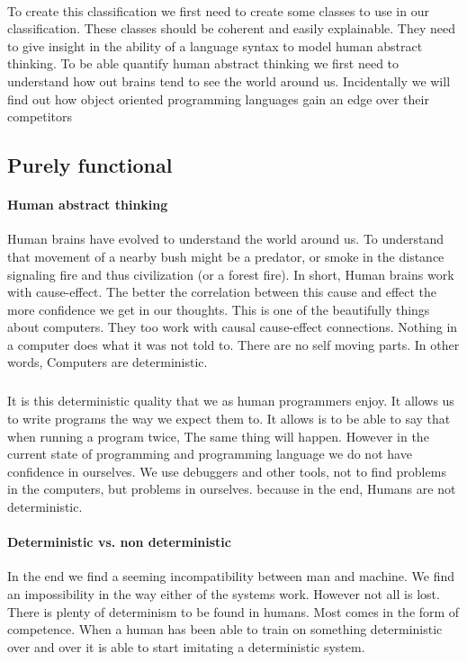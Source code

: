 \documentclass{scrartcl}
\begin{document}
    \paragraph{}
    To create this classification we first need to create some classes to use 
    in our classification. These classes should be coherent and easily explainable.
    They need to give insight in the ability of a language syntax to model human abstract thinking.
    To be able quantify human abstract thinking we first need to understand how
    out brains tend to see the world around us. Incidentally we will find out how
    object oriented programming languages gain an edge over their competitors
    \newpage

    \subsection{Purely functional}
    \paragraph{Human abstract thinking}
    Human brains have evolved to understand the world around us. To understand that
    movement of a nearby bush might be a predator, or smoke in the distance
    signaling fire and thus civilization (or a forest fire). In short, Human brains
    work with cause-effect. The better the correlation between this cause and effect
    the more confidence we get in our thoughts. This is one of the beautifully things 
    about computers. They too work with causal cause-effect connections. Nothing in a
    computer does what it was not told to. There are no self moving parts. In other words,
    Computers are deterministic. 

    \subparagraph{}
    It is this deterministic quality that we as human programmers enjoy. It allows
    us to write programs the way we expect them to. It allows is to be able to say that
    when running a program twice, The same thing will happen. However in the current state
    of programming and programming language we do not have confidence in ourselves. 
    We use debuggers and other tools, not to find problems in the computers, but problems in
    ourselves. because in the end, Humans are not deterministic.

    \paragraph{Deterministic vs. non deterministic}
    In the end we find a seeming incompatibility between man and machine.
    We find an impossibility in the way either of the systems work. However
    not all is lost. There is plenty of determinism to be found in humans.
    Most comes in the form of competence. When a human has been able to train
    on something deterministic over and over it is able to start imitating a
    deterministic system. 
    
\end{document}
